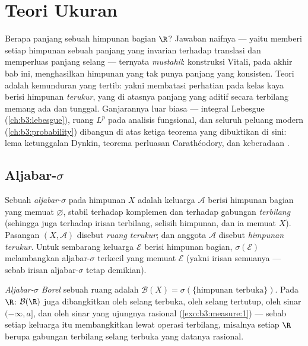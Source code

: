 \chapter{Teori Ukuran}\label{ch:b3:measure}

Berapa panjang sebuah himpunan bagian $\R$? Jawaban naifnya --- yaitu memberi
setiap himpunan sebuah panjang yang invarian terhadap translasi dan memperluas panjang
selang --- ternyata \emph{mustahil}: konstruksi Vitali, pada
akhir bab ini, menghasilkan himpunan yang tak punya panjang yang
konsisten. Teori  adalah kemunduran yang tertib: yakni membatasi
perhatian pada kelas kaya berisi himpunan \emph{terukur}, yang di atasnya
panjang yang aditif secara terbilang memang ada dan tunggal. Ganjarannya
luar biasa --- integral Lebesgue (\cref{ch:b3:lebesgue}),
ruang $L^p$ pada analisis fungsional, dan seluruh peluang
modern (\cref{ch:b3:probability}) dibangun di atas ketiga
teorema yang dibuktikan di sini: lema ketunggalan Dynkin,
teorema perluasan Carathéodory, dan keberadaan
.

\section{Aljabar-$\sigma$}

\begin{definition}\label{def:b3:measure:sigmaalgebra}
Sebuah \emph{aljabar-$\sigma$}
pada himpunan $X$ adalah keluarga $\mathcal A$ berisi himpunan bagian yang memuat
$\varnothing$, stabil terhadap komplemen dan terhadap
gabungan \emph{terbilang} (sehingga juga terhadap irisan terbilang, selisih
himpunan, dan ia memuat $X$). Pasangan $(X, \mathcal A)$
disebut \emph{ruang terukur}; dan anggota $\mathcal A$ disebut
\emph{himpunan terukur}. Untuk sembarang keluarga $\mathcal E$ berisi himpunan bagian,
$\sigma(\mathcal E)$ melambangkan aljabar-$\sigma$ terkecil
yang memuat $\mathcal E$ (yakni irisan semuanya ---
sebab irisan aljabar-$\sigma$ tetap demikian).
\end{definition}

\begin{definition}\label{def:b3:measure:borel}
\emph{Aljabar-$\sigma$ Borel} sebuah ruang  adalah
$\mathcal B(X) = \sigma(\{\text{himpunan terbuka}\})$. Pada $\R$:
$\mathcal B(\R)$ juga dibangkitkan oleh selang terbuka, oleh
selang tertutup, oleh sinar $(-\infty, a]$, dan oleh sinar
yang ujungnya rasional (\cref{exo:b3:measure:1}) --- sebab setiap
keluarga itu membangkitkan  lewat operasi terbilang, misalnya
setiap  $\R$ berupa gabungan terbilang selang terbuka
yang datanya rasional.
\end{definition}

